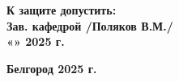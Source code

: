 \begin{titlepage}
    \vspace{2cm} 
    
    \centering
    \begin{minipage}{0.7\textwidth}
        \textbf{К защите допустить:\\
        Зав. кафедрой \underline{\hspace{4cm}} /Поляков В.М./\\
        «\underline{\hspace{1cm}}» \underline{\hspace{2cm}} 2025 г.}
    \end{minipage}
    
    \vfill
    
    \textbf{Белгород 2025 г.}
    
\end{titlepage}

